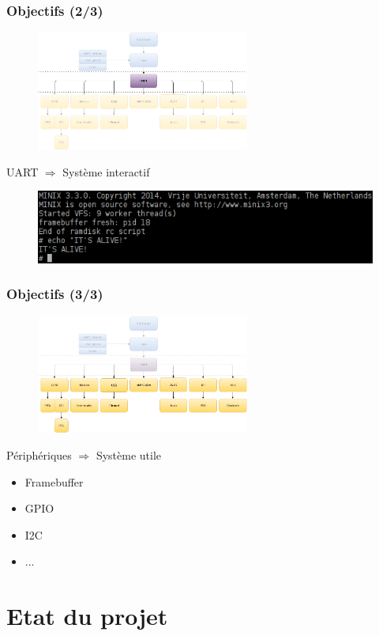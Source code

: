 \documentclass{beamer}
\begin{document}
\begin{frame}
\frametitle{Objectifs (2/3)}
\begin{figure}[center]
\includegraphics[width=7cm,natwidth=915,natheight=511]{GrapheSpe-2.png}
\end{figure}
UART $\Rightarrow$ Système interactif
\begin{figure}[center]
\includegraphics[width=12cm,natwidth=527,natheight=114]{console.png}
\end{figure}
\end{frame}

\begin{frame}
\frametitle{Objectifs (3/3)}
\begin{figure}[center]
\includegraphics[width=7cm,natwidth=915,natheight=511]{GrapheSpe-3.png}
\end{figure}
Périphériques $\Rightarrow$ Système utile
\begin{itemize}
\item Framebuffer
\item GPIO
\item I2C
\item ...
\end{itemize}
\end{frame}

\section{Etat du projet}
\end{document}
